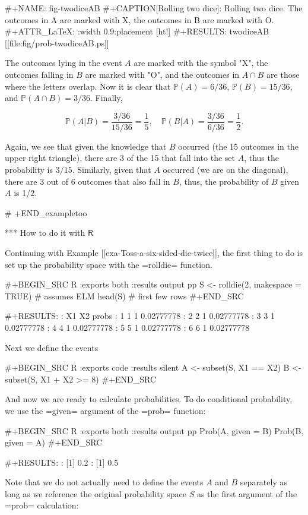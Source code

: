 #+NAME: fig-twodiceAB
#+CAPTION[Rolling two dice]: \small Rolling two dice. The outcomes in A are marked with X, the outcomes in B are marked with O.
#+ATTR_LaTeX: :width 0.9\textwidth :placement [ht!]
#+RESULTS: twodiceAB
[[file:fig/prob-twodiceAB.ps]]

The outcomes lying in the event \(A\) are marked with the symbol
"X", the outcomes falling in \(B\) are marked with "O", and the
outcomes in \(A\cap B\) are those where the letters overlap. Now it is
clear that \(\mathbb{P}(A)=6/36\), \(\mathbb{P}(B)=15/36\), and
\(\mathbb{P}(A\cap B)=3/36\).  Finally, 

\[
\mathbb{P}(A|B)=\frac{3/36}{15/36}=\frac{1}{5},\quad
\mathbb{P}(B|A)=\frac{3/36}{6/36}=\frac{1}{2}.  
\] 

Again, we see that given the knowledge that \(B\) occurred (the 15
outcomes in the upper right triangle), there are 3 of the 15 that fall
into the set \(A\), thus the probability is \(3/15\). Similarly, given
that \(A\) occurred (we are on the diagonal), there are 3 out of 6
outcomes that also fall in \(B\), thus, the probability of \(B\) given
\(A\) is 1/2.

# +END_exampletoo

*** How to do it with \(\mathsf{R}\)

Continuing with Example [[exa-Toss-a-six-sided-die-twice]], the first thing to do is set
up the probability space with the =rolldie= function.

#+BEGIN_SRC R :exports both :results output pp  
S <- rolldie(2, makespace = TRUE)  # assumes ELM
head(S)                            #  first few rows
#+END_SRC

#+RESULTS:
:   X1 X2      probs
: 1  1  1 0.02777778
: 2  2  1 0.02777778
: 3  3  1 0.02777778
: 4  4  1 0.02777778
: 5  5  1 0.02777778
: 6  6  1 0.02777778

Next we define the events

#+BEGIN_SRC R :exports code :results silent
A <- subset(S, X1 == X2)
B <- subset(S, X1 + X2 >= 8)
#+END_SRC

And now we are ready to calculate probabilities. To do conditional
probability, we use the =given= argument of the =prob= function:

#+BEGIN_SRC R :exports both :results output pp  
Prob(A, given = B)
Prob(B, given = A)
#+END_SRC

#+RESULTS:
: [1] 0.2
: [1] 0.5

Note that we do not actually need to define the events \(A\) and \(B\)
separately as long as we reference the original probability space
\(S\) as the first argument of the =prob= calculation:

